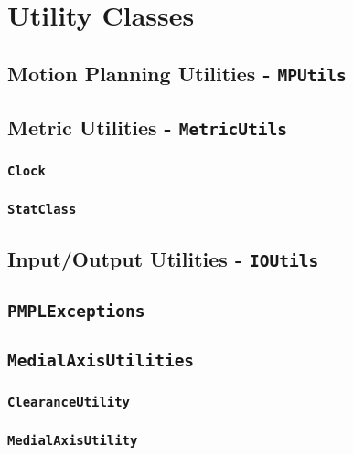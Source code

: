 \chapter{Utility Classes}

\section{Motion Planning Utilities - \texttt{MPUtils}}

\section{Metric Utilities - \texttt{MetricUtils}}

\subsection{\texttt{Clock}}

\subsection{\texttt{StatClass}}

\section{Input/Output Utilities - \texttt{IOUtils}}

\section{\texttt{PMPLExceptions}}

\section{\texttt{MedialAxisUtilities}}

\subsection{\texttt{ClearanceUtility}}

\subsection{\texttt{MedialAxisUtility}}

